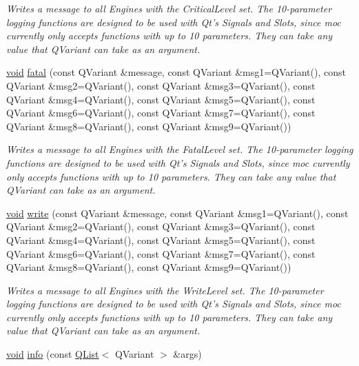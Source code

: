 \begin{DoxyCompactItemize}
\begin{DoxyCompactList}\small\item\em Writes a message to all Engines with the Critical\-Level set. The 10-\/parameter logging functions are designed to be used with Qt's Signals and Slots, since moc currently only accepts functions with up to 10 parameters. They can take any value that Q\-Variant can take as an argument. \end{DoxyCompactList}\item 
\hyperlink{group___u_a_v_objects_plugin_ga444cf2ff3f0ecbe028adce838d373f5c}{void} \hyperlink{class_qxt_logger_aed55f44d6c49d9b6a43ab640a6e1912a}{fatal} (const Q\-Variant \&message, const Q\-Variant \&msg1=Q\-Variant(), const Q\-Variant \&msg2=Q\-Variant(), const Q\-Variant \&msg3=Q\-Variant(), const Q\-Variant \&msg4=Q\-Variant(), const Q\-Variant \&msg5=Q\-Variant(), const Q\-Variant \&msg6=Q\-Variant(), const Q\-Variant \&msg7=Q\-Variant(), const Q\-Variant \&msg8=Q\-Variant(), const Q\-Variant \&msg9=Q\-Variant())
\begin{DoxyCompactList}\small\item\em Writes a message to all Engines with the Fatal\-Level set. The 10-\/parameter logging functions are designed to be used with Qt's Signals and Slots, since moc currently only accepts functions with up to 10 parameters. They can take any value that Q\-Variant can take as an argument. \end{DoxyCompactList}\item 
\hyperlink{group___u_a_v_objects_plugin_ga444cf2ff3f0ecbe028adce838d373f5c}{void} \hyperlink{class_qxt_logger_aff3ef14556d97992bec9a68e3e1e1315}{write} (const Q\-Variant \&message, const Q\-Variant \&msg1=Q\-Variant(), const Q\-Variant \&msg2=Q\-Variant(), const Q\-Variant \&msg3=Q\-Variant(), const Q\-Variant \&msg4=Q\-Variant(), const Q\-Variant \&msg5=Q\-Variant(), const Q\-Variant \&msg6=Q\-Variant(), const Q\-Variant \&msg7=Q\-Variant(), const Q\-Variant \&msg8=Q\-Variant(), const Q\-Variant \&msg9=Q\-Variant())
\begin{DoxyCompactList}\small\item\em Writes a message to all Engines with the Write\-Level set. The 10-\/parameter logging functions are designed to be used with Qt's Signals and Slots, since moc currently only accepts functions with up to 10 parameters. They can take any value that Q\-Variant can take as an argument. \end{DoxyCompactList}\item 
\hyperlink{group___u_a_v_objects_plugin_ga444cf2ff3f0ecbe028adce838d373f5c}{void} \hyperlink{class_qxt_logger_a08dbbd28154fe8a2dc004e4f79b73e72}{info} (const \hyperlink{class_q_list}{Q\-List}$<$ Q\-Variant $>$ \&args)

\end{DoxyCompactItemize}
